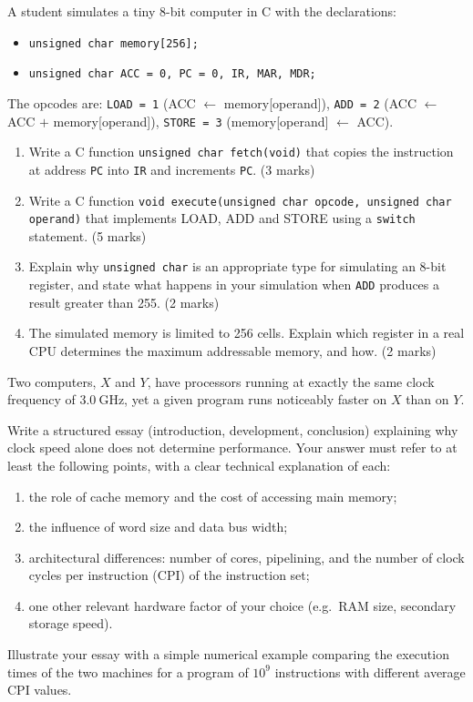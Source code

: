 \documentclass[11pt]{article}
\newcommand{\cle}[1]{{\popxbold\color{popdark}#1}}
\begin{document}
\begin{exercice}
A student simulates a tiny 8-bit computer in C with the declarations:
\begin{itemize}
\item[] \texttt{unsigned char memory[256];}
\item[] \texttt{unsigned char ACC = 0, PC = 0, IR, MAR, MDR;}
\end{itemize}
The opcodes are: \texttt{LOAD = 1} (ACC $\leftarrow$ memory[operand]), \texttt{ADD = 2} (ACC $\leftarrow$ ACC $+$ memory[operand]), \texttt{STORE = 3} (memory[operand] $\leftarrow$ ACC).
\begin{enumerate}
\item Write a C function \texttt{unsigned char fetch(void)} that copies the instruction at address \texttt{PC} into \texttt{IR} and increments \texttt{PC}. \hfill (3 marks)
\item Write a C function \texttt{void execute(unsigned char opcode, unsigned char operand)} that implements LOAD, ADD and STORE using a \texttt{switch} statement. \hfill (5 marks)
\item Explain why \texttt{unsigned char} is an appropriate type for simulating an 8-bit register, and state what happens in your simulation when \texttt{ADD} produces a result greater than 255. \hfill (2 marks)
\item The simulated memory is limited to 256 cells. Explain which register in a real CPU determines the maximum addressable memory, and how. \hfill (2 marks)
\end{enumerate}
\end{exercice}

\begin{exercice}
Two computers, $X$ and $Y$, have processors running at exactly the same clock frequency of $3.0\ \mathrm{GHz}$, yet a given program runs noticeably faster on $X$ than on $Y$.

Write a structured essay (introduction, development, conclusion) explaining why clock speed alone does not determine performance. Your answer must refer to at least the following points, with a clear technical explanation of each:
\begin{enumerate}
\item the role of \cle{cache memory} and the cost of accessing main memory;
\item the influence of \cle{word size} and data bus width;
\item architectural differences: number of cores, pipelining, and the number of clock cycles per instruction (CPI) of the instruction set;
\item one other relevant hardware factor of your choice (e.g.\ RAM size, secondary storage speed).
\end{enumerate}
Illustrate your essay with a simple numerical example comparing the execution times of the two machines for a program of $10^9$ instructions with different average CPI values.
\end{exercice}
\end{document}
